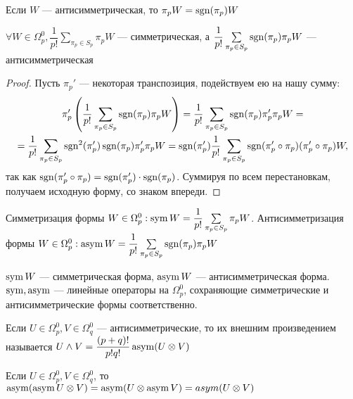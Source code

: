\begin{prop}
	Если $W$ --- антисимметрическая, то $\pi_pW=\operatorname{sgn}(\pi_p)W$
\end{prop}

\begin{prop}
	$\forall W\in \Omega_p^0, \dfrac{1}{p!}\sum\limits_{\pi_p\in S_p}\pi_pW$ --- симметрическая, а $\dfrac{1}{p!}\sum\limits_{\pi_p\in S_p}\sgn(\pi_p)\pi_pW$ --- антисимметрическая
\end{prop}

\begin{proof}
	Пусть $\pi_p'$ --- некоторая транспозиция, подействуем ею на нашу сумму: 
	\begin{multline*}\pi_p'\left(\dfrac{1}{p!}\sum\limits_{\pi_p\in S_p}\sgn(\pi_p)\pi_pW\right)=\dfrac{1}{p!}\sum\limits_{\pi_p\in S_p}\sgn(\pi_p)\pi'_p\pi_pW = \\ =
	\dfrac{1}{p!}\sum\limits_{\pi_p\in S_p}\sgn^2(\pi'_p)\sgn(\pi_p)\pi'_p\pi_pW = \sgn(\pi'_p)\dfrac{1}{p!}\sum\limits_{\pi_p\in S_p}\sgn(\pi'_p\circ\pi_p)(\pi'_p\circ\pi_p)W, 
\end{multline*}
	так как $\operatorname{sgn}(\pi'_p\circ\pi_p)=\operatorname{sgn}(\pi'_p)\cdot\operatorname{sgn}(\pi_p)$. Суммируя по всем перестановкам, получаем исходную форму, со знаком впереди.
\end{proof}

\begin{Def}
	Симметризация формы $W\in\Omega_p^0: \sym W =\dfrac{1}{p!}\sum\limits_{\pi_p\in S_p}\pi_pW$. Антисимметризация формы $W\in\Omega_p^0: \asym W =\dfrac{1}{p!}\sum\limits_{\pi_p\in S_p}\sgn(\pi_p)\pi_pW$
\end{Def}

\begin{prop}
	$\operatorname{sym} W$ --- симметрическая форма, $\operatorname{asym} W$ --- антисимметрическая форма. $\operatorname{sym} , \operatorname{asym} $ --- линейные операторы на $\Omega_p^0$, сохраняющие симметрические и антисимметрические формы соответственно.
\end{prop}

\begin{Def}
	Если $U\in\Omega_p^0, V\in\Omega_q^0$ --- антисимметрические, то их внешним произведением называется $U\wedge V = \dfrac{(p+q)!}{p!q!}\operatorname{asym}(U\otimes V)$
\end{Def}


\begin{lemma}
	Если $U\in \Omega_p^0, V\in\Omega_q^0$, то $\operatorname{asym}(\operatorname{asym} U\otimes V)=\operatorname{asym}(U \otimes \operatorname{asym} V)=asym(U\otimes V)$
\end{lemma}

